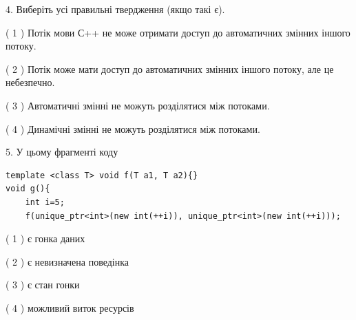 \documentclass[12pt, ukrainian]{article}
\begin{document}
\begin {large}
{%
4. Виберіть усі правильні твердження (якщо такі є).\par

( 1 ) Потік мови С++ не може отримати доступ до автоматичних змінних іншого потоку.%

( 2 ) Потік може мати доступ до автоматичних змінних іншого потоку, але це небезпечно.%

( 3 ) Автоматичні змінні не можуть розділятися між потоками.%

( 4 ) Динамічні змінні не можуть розділятися між потоками.%


5. У цьому фрагменті коду
\begin{verbatim}
template <class T> void f(T a1, T a2){}
void g(){
    int i=5;
    f(unique_ptr<int>(new int(++i)), unique_ptr<int>(new int(++i)));
\end{verbatim}

( 1 ) є гонка даних%

( 2 ) є невизначена поведінка%

( 3 ) є стан гонки%

( 4 ) можливий виток ресурсів%
}
\end {large}
\end{document}
